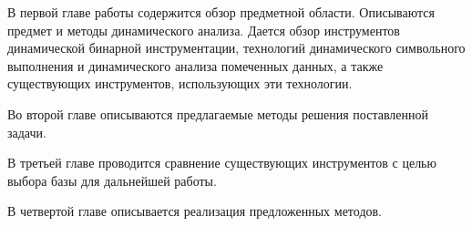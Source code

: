 В первой главе работы содержится обзор предметной области. Описываются предмет и методы динамического анализа. Дается обзор инструментов динамической бинарной инструментации, технологий динамического символьного выполнения и динамического анализа помеченных данных, а также существующих инструментов, использующих эти технологии.

Во второй главе описываются предлагаемые методы решения поставленной задачи.

В третьей главе проводится сравнение существующих инструментов с целью выбора базы для дальнейшей работы.

В четвертой главе описывается реализация предложенных методов.
